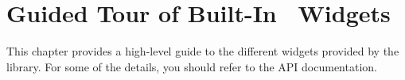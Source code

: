 \chapter{Guided Tour of Built-In \vtyui\ Widgets}

This chapter provides a high-level guide to the different widgets
provided by the library.  For some of the details, you should refer to
the API documentation.

